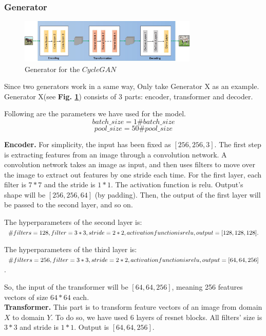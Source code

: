 \documentclass[journal]{IEEEtran}
\begin{document}
\subsubsection{Generator}
\begin{figure}[htbp]
	\centering
	\includegraphics[width=8.5cm]{fig/generator.jpg}
	
	\caption{Generator for the $CycleGAN$}
	\label{fig:Generator}  
\end{figure}
Since two generators work in a same way, Only take Generator X as an example.
Generator X(see \textbf{Fig. \ref{fig:Generator}}) consists of 3 parts: encoder, transformer and decoder.

Following are the parameters we have used for the model.
$$
batch\_size = 1 \# batch\_size
$$
$$
pool\_size = 50 \# pool\_size
$$

\textbf{Encoder.}
For simplicity, the input has been fixed as $[256,256,3]$. The first step is extracting features from an image through a convolution network. A convolution network takes an image as input, and then uses filters to move over the image to extract out features by one stride each time. For the first layer, each filter is $7*7$ and the stride is $1*1$. The activation function is relu.  Output’s shape will be $[256,256,64]$ (by padding). Then, the output of the first layer will be passed to the second layer, and so on. 

The hyperparameters of the second layer is:\\
$ \#filters=128, filter= 3*3, stride=2*2,\\
 activation function is relu, \\
 output= [128,128,128].$

The hyperparameters of the third layer is: \\
$\#filters=256, filter= 3*3, stride=2*2, \\
activation function is relu, \\
output= [64,64,256]$.

So, the input of the transformer will be $[64,64,256]$, meaning 256 features vectors of size $64*64$ each.\\

\textbf{Transformer.}
This part is to transform feature vectors of an image from domain $X$ to domain $Y$. To do so, we have used 6 layers of resnet blocks. All filters’ size is $3*3$ and stride is $1*1$. Output is $[64,64,256]$.
\end{document}
